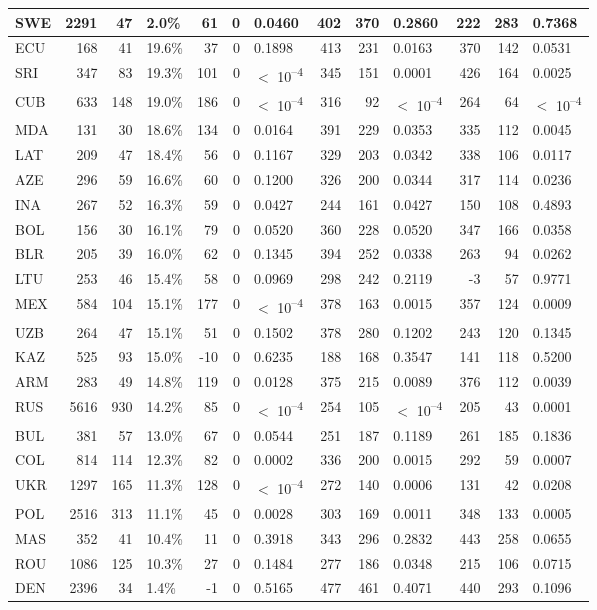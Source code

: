 \begin{tabular}{l|r|r|l|r|r|l|r|r|l|r|r|l}
\hline
SWE & 2291 & 47 & 2.0\% & 61 & 0 & 0.0460 & 402 & 370 & 0.2860 & 222 & 283 & 0.7368\\
\hline
ECU & 168 & 41 & 19.6\% & 37 & 0 & 0.1898 & 413 & 231 & 0.0163 & 370 & 142 & 0.0531\\
\hline
SRI & 347 & 83 & 19.3\% & 101 & 0 & $<$ 10\textsuperscript{--4} & 345 & 151 & 0.0001 & 426 & 164 & 0.0025\\
\hline
CUB & 633 & 148 & 19.0\% & 186 & 0 & $<$ 10\textsuperscript{--4} & 316 & 92 & $<$ 10\textsuperscript{--4} & 264 & 64 & $<$ 10\textsuperscript{--4}\\
\hline
MDA & 131 & 30 & 18.6\% & 134 & 0 & 0.0164 & 391 & 229 & 0.0353 & 335 & 112 & 0.0045\\
\hline
LAT & 209 & 47 & 18.4\% & 56 & 0 & 0.1167 & 329 & 203 & 0.0342 & 338 & 106 & 0.0117\\
\hline
AZE & 296 & 59 & 16.6\% & 60 & 0 & 0.1200 & 326 & 200 & 0.0344 & 317 & 114 & 0.0236\\
\hline
INA & 267 & 52 & 16.3\% & 59 & 0 & 0.0427 & 244 & 161 & 0.0427 & 150 & 108 & 0.4893\\
\hline
BOL & 156 & 30 & 16.1\% & 79 & 0 & 0.0520 & 360 & 228 & 0.0520 & 347 & 166 & 0.0358\\
\hline
BLR & 205 & 39 & 16.0\% & 62 & 0 & 0.1345 & 394 & 252 & 0.0338 & 263 & 94 & 0.0262\\
\hline
LTU & 253 & 46 & 15.4\% & 58 & 0 & 0.0969 & 298 & 242 & 0.2119 & -3 & 57 & 0.9771\\
\hline
MEX & 584 & 104 & 15.1\% & 177 & 0 & $<$ 10\textsuperscript{--4} & 378 & 163 & 0.0015 & 357 & 124 & 0.0009\\
\hline
UZB & 264 & 47 & 15.1\% & 51 & 0 & 0.1502 & 378 & 280 & 0.1202 & 243 & 120 & 0.1345\\
\hline
KAZ & 525 & 93 & 15.0\% & -10 & 0 & 0.6235 & 188 & 168 & 0.3547 & 141 & 118 & 0.5200\\
\hline
ARM & 283 & 49 & 14.8\% & 119 & 0 & 0.0128 & 375 & 215 & 0.0089 & 376 & 112 & 0.0039\\
\hline
RUS & 5616 & 930 & 14.2\% & 85 & 0 & $<$ 10\textsuperscript{--4} & 254 & 105 & $<$ 10\textsuperscript{--4} & 205 & 43 & 0.0001\\
\hline
BUL & 381 & 57 & 13.0\% & 67 & 0 & 0.0544 & 251 & 187 & 0.1189 & 261 & 185 & 0.1836\\
\hline
COL & 814 & 114 & 12.3\% & 82 & 0 & 0.0002 & 336 & 200 & 0.0015 & 292 & 59 & 0.0007\\
\hline
UKR & 1297 & 165 & 11.3\% & 128 & 0 & $<$ 10\textsuperscript{--4} & 272 & 140 & 0.0006 & 131 & 42 & 0.0208\\
\hline
POL & 2516 & 313 & 11.1\% & 45 & 0 & 0.0028 & 303 & 169 & 0.0011 & 348 & 133 & 0.0005\\
\hline
MAS & 352 & 41 & 10.4\% & 11 & 0 & 0.3918 & 343 & 296 & 0.2832 & 443 & 258 & 0.0655\\
\hline
ROU & 1086 & 125 & 10.3\% & 27 & 0 & 0.1484 & 277 & 186 & 0.0348 & 215 & 106 & 0.0715\\
\hline
DEN & 2396 & 34 & 1.4\% & -1 & 0 & 0.5165 & 477 & 461 & 0.4071 & 440 & 293 & 0.1096\\
\hline
\end{tabular}
